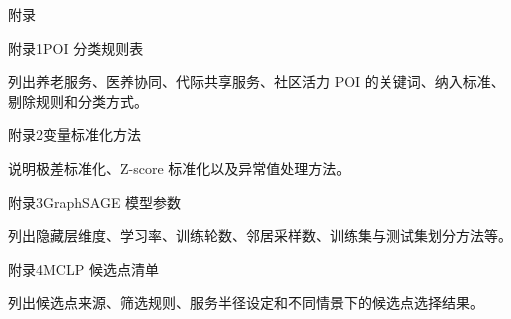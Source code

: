 \clearpage
{}
{}

\begin{center}
    {\FZhei{}\setlength{\baselineskip}{24pt}\selectfont 附录\par}
\end{center}

{\FZkai{}\setlength{\baselineskip}{24pt}\selectfont 附录1\quad POI 分类规则表\par}

列出养老服务、医养协同、代际共享服务、社区活力 POI 的关键词、纳入标准、剔除规则和分类方式。

{\FZkai{}\setlength{\baselineskip}{24pt}\selectfont 附录2\quad 变量标准化方法\par}

说明极差标准化、Z-score 标准化以及异常值处理方法。

{\FZkai{}\setlength{\baselineskip}{24pt}\selectfont 附录3\quad GraphSAGE 模型参数\par}

列出隐藏层维度、学习率、训练轮数、邻居采样数、训练集与测试集划分方法等。

{\FZkai{}\setlength{\baselineskip}{24pt}\selectfont 附录4\quad MCLP 候选点清单\par}

列出候选点来源、筛选规则、服务半径设定和不同情景下的候选点选择结果。

